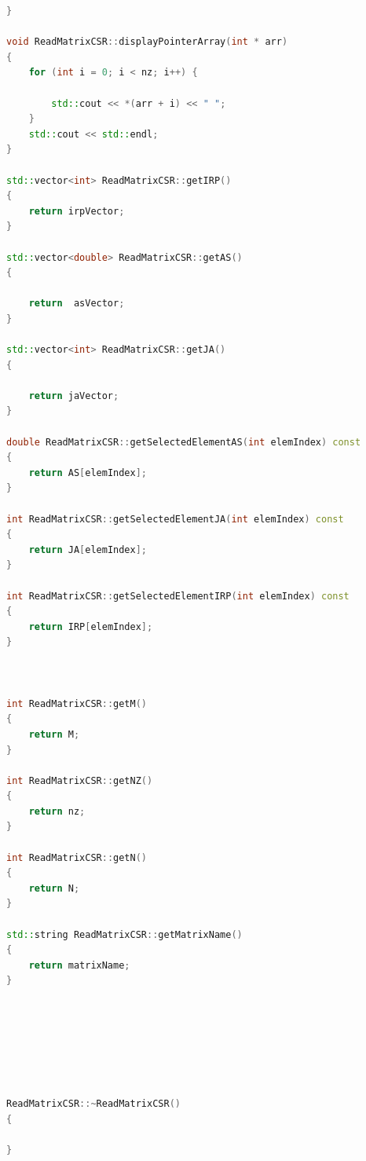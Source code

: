 \documentclass{scrreprt}
\begin{document}
\begin{lstlisting}[language=C++, caption=ReadMatrixCSR.cpp]
}

void ReadMatrixCSR::displayPointerArray(int * arr)
{
	for (int i = 0; i < nz; i++) {

		std::cout << *(arr + i) << " ";
	}
	std::cout << std::endl;
}

std::vector<int> ReadMatrixCSR::getIRP()
{
	return irpVector;
}

std::vector<double> ReadMatrixCSR::getAS()
{

	return  asVector;
}

std::vector<int> ReadMatrixCSR::getJA()
{

	return jaVector;
}

double ReadMatrixCSR::getSelectedElementAS(int elemIndex) const
{
	return AS[elemIndex];
}

int ReadMatrixCSR::getSelectedElementJA(int elemIndex) const
{
	return JA[elemIndex];
}

int ReadMatrixCSR::getSelectedElementIRP(int elemIndex) const
{
	return IRP[elemIndex];
}



int ReadMatrixCSR::getM()
{
	return M;
}

int ReadMatrixCSR::getNZ()
{
	return nz;
}

int ReadMatrixCSR::getN()
{
	return N;
}

std::string ReadMatrixCSR::getMatrixName()
{
	return matrixName;
}







ReadMatrixCSR::~ReadMatrixCSR()
{
	
}


\end{lstlisting}
\end{document}
